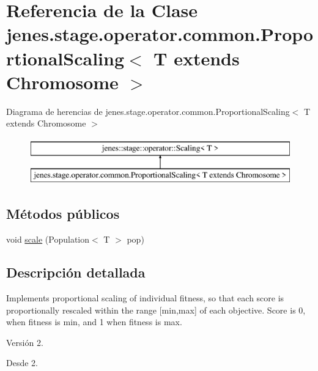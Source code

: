 \hypertarget{classjenes_1_1stage_1_1operator_1_1common_1_1_proportional_scaling_3_01_t_01extends_01_chromosome_01_4}{\section{Referencia de la Clase jenes.\-stage.\-operator.\-common.\-Proportional\-Scaling$<$ T extends Chromosome $>$}
\label{classjenes_1_1stage_1_1operator_1_1common_1_1_proportional_scaling_3_01_t_01extends_01_chromosome_01_4}
}
Diagrama de herencias de jenes.\-stage.\-operator.\-common.\-Proportional\-Scaling$<$ T extends Chromosome $>$\begin{figure}[H]
\begin{center}
\leavevmode
\includegraphics[height=2.000000cm]{classjenes_1_1stage_1_1operator_1_1common_1_1_proportional_scaling_3_01_t_01extends_01_chromosome_01_4}
\end{center}
\end{figure}
\subsection*{Métodos públicos}
\begin{DoxyCompactItemize}
\item 
void \hyperlink{classjenes_1_1stage_1_1operator_1_1common_1_1_proportional_scaling_3_01_t_01extends_01_chromosome_01_4_a5b8ae9f116348cebc390e0a58602a704}{scale} (Population$<$ T $>$ pop)
\end{DoxyCompactItemize}


\subsection{Descripción detallada}
Implements proportional scaling of individual fitness, so that each score is proportionally rescaled within the range \mbox{[}min,max\mbox{]} of each objective. Score is 0, when fitness is min, and 1 when fitness is max.

\begin{DoxyVersion}{Versión}
2. 
\end{DoxyVersion}
\begin{DoxySince}{Desde}
2. 
\end{DoxySince}


